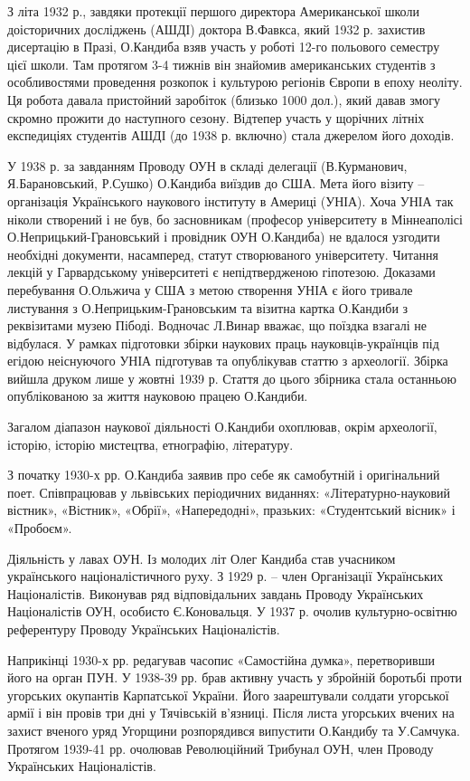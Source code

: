 З літа 1932 р., завдяки протекції першого директора Американської школи
доісторичних досліджень (АШДІ) доктора В.Фавкса, який 1932 р. захистив
дисертацію в Празі, О.Кандиба взяв участь у роботі 12-го польового семестру
цієї школи. Там протягом 3-4 тижнів він знайомив американських студентів з
особливостями проведення розкопок і культурою регіонів Європи в епоху неоліту.
Ця робота давала пристойний заробіток (близько 1000 дол.), який давав змогу
скромно прожити до наступного сезону. Відтепер участь у щорічних літніх
експедиціях студентів АШДІ (до 1938 р. включно) стала джерелом його доходів.

У 1938 р. за завданням Проводу ОУН в складі делегації (В.Курманович,
Я.Барановський, Р.Сушко) О.Кандиба виїздив до США. Мета його візиту –
організація Українського наукового інституту в Америці (УНІА). Хоча УНІА так
ніколи створений і не був,  бо засновникам (професор університету в
Міннеаполісі О.Неприцький-Грановський і провідник ОУН О.Кандиба) не вдалося
узгодити необхідні документи, насамперед, статут створюваного університету.
Читання лекцій у Гарвардському університеті є непідтвердженою гіпотезою.
Доказами перебування О.Ольжича у США з метою створення УНІА є його тривале
листування з О.Неприцьким-Грановським та візитна картка О.Кандиби з реквізитами
музею Пібоді. Водночас Л.Винар вважає, що поїздка взагалі не відбулася. У
рамках підготовки збірки наукових праць науковців-українців під егідою
неіснуючого УНІА підготував та опублікував статтю з археології. Збірка вийшла
друком лише у жовтні 1939 р. Стаття до цього збірника стала останньою
опублікованою за життя науковою працею О.Кандиби.

Загалом діапазон наукової діяльності О.Кандиби охоплював, окрім археології, історію, історію мистецтва, етнографію, літературу.

З початку 1930-х рр. О.Кандиба заявив про себе як самобутній і оригінальний
поет. Співпрацював у львівських періодичних виданнях: «Літературно-науковий
вістник», «Вістник», «Обрії», «Напередодні», празьких: «Студентський вісник» і
«Пробоєм».

Діяльність у лавах ОУН. Із молодих літ Олег Кандиба став учасником українського
націоналістичного руху. З 1929 р. – член Організації Українських Націоналістів.
Виконував ряд відповідальних завдань Проводу Українських Націоналістів ОУН,
особисто Є.Коновальця. У 1937 р. очолив культурно-освітню референтуру Проводу
Українських Націоналістів.

Наприкінці 1930-х рр. редагував часопис «Самостійна думка», перетворивши його
на орган ПУН. У 1938-39 рр. брав активну участь у збройній боротьбі проти
угорських окупантів Карпатської України. Його заарештували солдати угорської
армії і він провів три дні у Тячівській в'язниці. Після листа угорських вчених
на захист вченого уряд Угорщини розпорядився випустити О.Кандибу та У.Самчука.
Протягом 1939-41 рр. очолював Революційний Трибунал ОУН, член Проводу
Українських Націоналістів.

